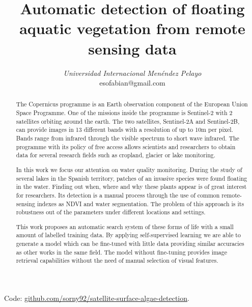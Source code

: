 \documentclass[conference]{IEEEtran}
\begin{document}
    \title{Automatic detection of floating aquatic vegetation from remote sensing data}

    \author{
    \textit{Universidad Internacional Menéndez Pelayo}\\
    esofabian@gmail.com}

    \maketitle

    \begin{abstract}
        The Copernicus programme is an Earth observation component of the European Union Space Programme.
        One of the missions inside the programme is Sentinel-2 with 2 satellites orbiting around the earth.
        The two satellites, Sentinel-2A and Sentinel-2B, can provide images in 13 different bands with a resolution of
        up to 10m per pixel.
        Bands range from infrared through the visible spectrum to short wave infrared.
        The programme with its policy of free access allows scientists and researchers to obtain data for several
        research fields such as cropland, glacier or lake monitoring.

        In this work we focus our attention on water quality monitoring.
        During the study of several lakes in the Spanish territory, patches of an invasive species were found floating in the water.
        Finding out when, where and why these plants appear is of great interest for researchers.
        Its detection is a manual process through the use of common remote-sensing indexes as NDVI and water segmentation.
        The problem of this approach is its robustness out of the parameters under different locations and settings.

        This work proposes an automatic search system of these forms of life with a small amount of labelled training data.
        By applying self-supervised learning we are able to generate a model which can be fine-tuned with little data providing similar
        accuracies as other works in the same field.
        The model without fine-tuning provides image retrieval capabilities without the need of manual selection of visual features.
    \end{abstract}
    \newline
    Code: \href{https://github.com/sorny92/satellite-surface-algae-detection}{github.com/sorny92/satellite-surface-algae-detection}.
    \newline
\end{document}
